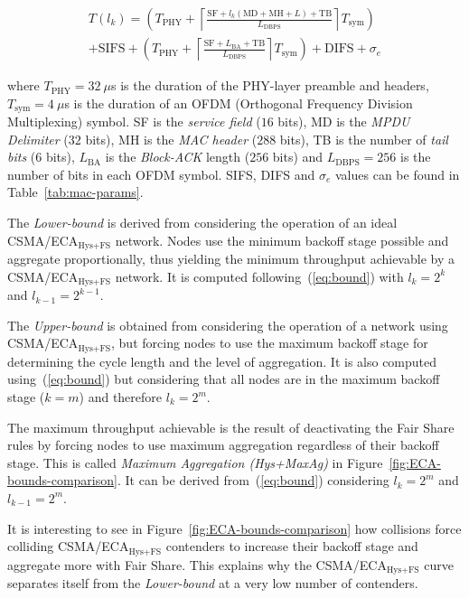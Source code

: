 \documentclass[a4paper,journal]{IEEEtran}
\begin{document}
	\begin{multline}\label{eq:Ts}
		T(l_{k})= \left( T_{\text{PHY}} + \left\lceil \frac{ \text{SF} + l_{k} (\text{MD}+\text{MH}+L) + \text{TB}}{L_{\text{DBPS}}}\right\rceil T_{\text{sym}} \right) \\ 
		+ \text{SIFS}+\left(T_{\text{PHY}} + \left\lceil\frac{\text{SF} + L_{\text{BA}} + \text{TB}}{L_{\text{DBPS}}} \right \rceil T_{\text{sym}} \right) + \text{DIFS} + \sigma_{e}
	\end{multline}
	
	where $T_{\text{PHY}}=32~\mu$s is the duration of the PHY-layer preamble and headers, $T_{\text{sym}}=4~\mu$s is the duration of an OFDM (Orthogonal Frequency Division Multiplexing) symbol. SF is the \emph{service field} ($16$ bits), $\text{MD}$ is the \textit{MPDU Delimiter} ($32$ bits), MH is the \emph{MAC header} ($288$ bits), TB is the number of \emph{tail bits} ($6$ bits), $L_{\text{BA}}$ is the \emph{Block-ACK} length ($256$ bits) and $L_{\text{DBPS}}=256$ is the number of bits in each OFDM symbol. SIFS, DIFS and $\sigma_{e}$ values can be found in Table~\ref{tab:mac-params}.

	The \emph{Lower-bound} is derived from considering the operation of an ideal CSMA/ECA$_{\text{Hys+FS}}$ network. Nodes use the minimum backoff stage possible and aggregate proportionally, thus yielding the minimum throughput achievable by a CSMA/ECA$_{\text{Hys+FS}}$ network. It is computed following~(\ref{eq:bound}) with $l_{k}=2^{k}$ and $l_{k-1}=2^{k-1}$.
	
	The \emph{Upper-bound} is obtained from considering the operation of a network using CSMA/ECA$_{\text{Hys+FS}}$, but forcing nodes to use the maximum backoff stage for determining the cycle length and the level of aggregation. It is also computed using~(\ref{eq:bound}) but considering that all nodes are in the maximum backoff stage ($k=m$) and therefore $l_{k}=2^{m}$.
	
	The maximum throughput achievable is the result of deactivating the Fair Share rules by forcing nodes to use maximum aggregation regardless of their backoff stage. This is called \emph{Maximum Aggregation (Hys+MaxAg)} in Figure~\ref{fig:ECA-bounds-comparison}. It can be derived from~(\ref{eq:bound}) considering $l_{k} = 2^{m}$ and $l_{k-1}=2^{m}$.
		
	It is interesting to see in Figure~\ref{fig:ECA-bounds-comparison} how collisions force colliding CSMA/ECA$_{\text{Hys+FS}}$ contenders to increase their backoff stage and aggregate more with Fair Share. This explains why the CSMA/ECA$_{\text{Hys+FS}}$ curve separates itself from the \emph{Lower-bound} at a very low number of contenders. 
	
\end{document}
